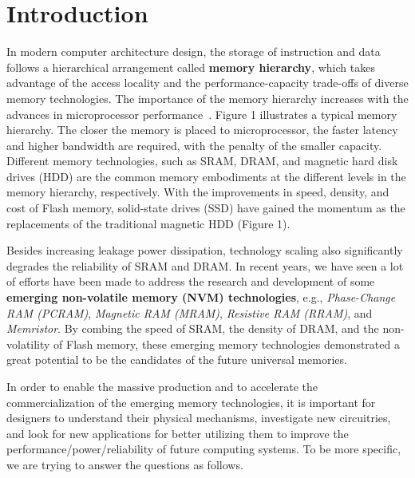 \section{Introduction}

In modern computer architecture design, the storage of instruction and data
follows a hierarchical arrangement called \textbf{memory
hierarchy}, which takes advantage of the access locality and the performance-capacity trade-offs of
diverse memory technologies. The importance of the memory hierarchy
increases with the advances in microprocessor performance~\cite{ITRS07}.
Figure 1 illustrates a typical memory hierarchy. The closer the memory is placed to microprocessor,
the faster latency and higher bandwidth are required, with the penalty of the smaller capacity.
Different memory technologies, such as SRAM, DRAM, and magnetic hard disk drives (HDD) are
the common memory embodiments at the different levels in the memory hierarchy, respectively.
With the improvements in speed, density, and cost of Flash memory,
solid-state drives (SSD) have gained the momentum as the replacements
of the traditional magnetic HDD (Figure 1).

Besides increasing leakage power dissipation, technology scaling also significantly degrades
the reliability of SRAM and DRAM. In recent years, we have seen a lot of efforts have been made
to address the research and development of some
\textbf{emerging non-volatile memory (NVM) technologies}, e.g.,
\textit{Phase-Change RAM (PCRAM)}, \textit{Magnetic RAM (MRAM)}, \textit{Resistive RAM (RRAM)}, and \textit{Memristor}.
By combing the speed of SRAM, the density of DRAM, and the
non-volatility of Flash memory, these emerging memory technologies demonstrated
a great potential to be the candidates of the future universal memories.

In order to enable the massive production and to accelerate the commercialization of the emerging memory technologies,
it is important for designers to understand their physical mechanisms, investigate new circuitries, and look for new
applications for better utilizing them to improve the performance/power/reliability of future computing systems.
To be more specific, we are trying to answer the questions as follows.

